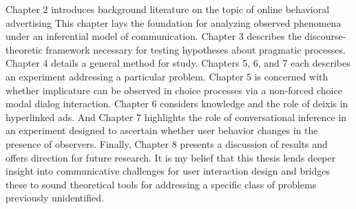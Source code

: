 Chapter 2 introduces background literature on the topic of online behavioral advertising This chapter lays the foundation for analyzing observed phenomena under an inferential model of communication. Chapter 3 describes the discourse-theoretic framework necessary for testing hypotheses about pragmatic processes. Chapter 4 details a general method for study. Chapters 5, 6, and 7 each describes an experiment addressing a particular problem. Chapter 5 is concerned with whether implicature can be observed in choice processes via a non-forced choice modal dialog interaction. Chapter 6 considers knowledge and the role of deixis in hyperlinked ads. And Chapter 7 highlights the role of conversational inference in an experiment designed to ascertain whether user behavior changes in the presence of observers. Finally, Chapter 8 presents a discussion of results and offers direction for future research. It is my belief that this thesis lends deeper insight into communicative challenges for user interaction design and bridges these to sound theoretical tools for addressing a specific class of problems previously unidentified.
